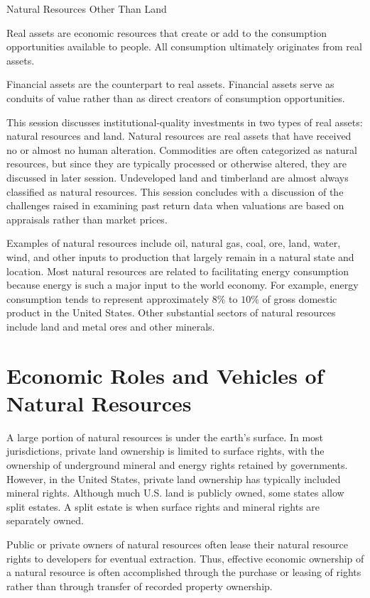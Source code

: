 \documentclass[11pt]{article}
\begin{document}
Natural Resources Other Than Land

Real assets are economic resources that create or add to the consumption opportunities available to people. All consumption ultimately originates from real assets.

Financial assets are the counterpart to real assets. Financial assets serve as conduits of value rather than as direct creators of consumption opportunities.

This session discusses institutional-quality investments in two types of real assets: natural resources and land. Natural resources are real assets that have received no or almost no human alteration. Commodities are often categorized as natural resources, but since they are typically processed or otherwise altered, they are discussed in later session. Undeveloped land and timberland are almost always classified as natural resources. This session concludes with a discussion of the challenges raised in examining past return data when valuations are based on appraisals rather than market prices.

Examples of natural resources include oil, natural gas, coal, ore, land, water, wind, and other inputs to production that largely remain in a natural state and location. Most natural resources are related to facilitating energy consumption because energy is such a major input to the world economy. For example, energy consumption tends to represent approximately $8 \%$ to $10 \%$ of gross domestic product in the United States. Other substantial sectors of natural resources include land and metal ores and other minerals.

\section*{Economic Roles and Vehicles of Natural Resources}
A large portion of natural resources is under the earth's surface. In most jurisdictions, private land ownership is limited to surface rights, with the ownership of underground mineral and energy rights retained by governments. However, in the United States, private land ownership has typically included mineral rights. Although much U.S. land is publicly owned, some states allow split estates. A split estate is when surface rights and mineral rights are separately owned.

Public or private owners of natural resources often lease their natural resource rights to developers for eventual extraction. Thus, effective economic ownership of a natural resource is often accomplished through the purchase or leasing of rights rather than through transfer of recorded property ownership.
\end{document}
